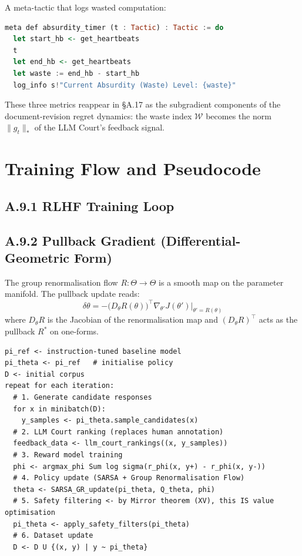 \documentclass[11pt,a4paper]{article}
\theoremstyle{definition}
\theoremstyle{remark}
\begin{document}
A meta-tactic that logs wasted computation:
\begin{lstlisting}[language=Haskell]
meta def absurdity_timer (t : Tactic) : Tactic := do
  let start_hb <- get_heartbeats
  t
  let end_hb <- get_heartbeats
  let waste := end_hb - start_hb
  log_info s!"Current Absurdity (Waste) Level: {waste}"
\end{lstlisting}

These three metrics reappear in \S A.17 as the subgradient components of the document-revision regret dynamics: the waste index $\mathcal{W}$ becomes the norm $\|g_t\|_*$ of the LLM Court's feedback signal.


\section{Training Flow and Pseudocode}

\subsection{A.9.1 RLHF Training Loop}

\subsection{A.9.2 Pullback Gradient (Differential-Geometric Form)}

The group renormalisation flow $R: \Theta \to \Theta$ is a smooth map on the parameter manifold. The pullback update reads:
\[
  \delta\theta = -\bigl(D_\theta R(\theta)\bigr)^\top \nabla_{\theta'} J(\theta')\Big|_{\theta' = R(\theta)}
\]
where $D_\theta R$ is the Jacobian of the renormalisation map and $(D_\theta R)^\top$ acts as the pullback $R^*$ on one-forms.

\begin{lstlisting}[caption={RLHF Training Loop Pseudocode}]
pi_ref <- instruction-tuned baseline model
pi_theta <- pi_ref   # initialise policy
D <- initial corpus
repeat for each iteration:
  # 1. Generate candidate responses
  for x in minibatch(D):
    y_samples <- pi_theta.sample_candidates(x)
  # 2. LLM Court ranking (replaces human annotation)
  feedback_data <- llm_court_rankings((x, y_samples))
  # 3. Reward model training
  phi <- argmax_phi Sum log sigma(r_phi(x, y+) - r_phi(x, y-))
  # 4. Policy update (SARSA + Group Renormalisation Flow)
  theta <- SARSA_GR_update(pi_theta, Q_theta, phi)
  # 5. Safety filtering <- by Mirror theorem (XV), this IS value optimisation
  pi_theta <- apply_safety_filters(pi_theta)
  # 6. Dataset update
  D <- D U {(x, y) | y ~ pi_theta}
\end{lstlisting}
\end{document}
